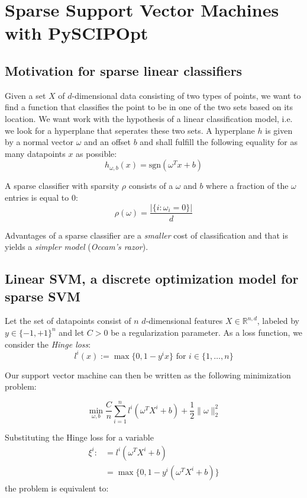 \documentclass[12pt]{article}
\newcommand\abs[1]{\left|#1\right|}
\newcommand{\R}{\mathbb{R}}
\begin{document}
\section*{Sparse Support Vector Machines with PySCIPOpt}

\subsection*{Motivation for sparse linear classifiers}

Given a set $X$ of $d$-dimensional data consisting of two types of points, we want to find a function that classifies the point to be in one of the two sets based on its location.
We want work with the hypothesis of a linear classification model, i.e. we look for a hyperplane that seperates these two sets.
A hyperplane $h$ is given by a normal vector $\omega$ and an offset $b$ and shall fulfill the following equality for as many datapoints $x$ as possible:
$$ h_{\omega, b}(x) = \text{sgn} (\omega^{T}x + b) $$

A sparse classifier with sparsity $\rho$ consists of a $\omega$ and $b$ where a fraction of the $\omega$ entries is equal to 0:
$$ \rho(\omega) = \frac{\abs{\{ i \colon \omega_{i} = 0 \}}}{d} $$

Advantages of a sparse classifier are a \emph{smaller} cost of classification and that is yields a \emph{simpler model} (\emph{Occam's razor}).

\subsection*{Linear SVM, a discrete optimization model for sparse SVM}

Let the set of datapoints consist of $n$ $d$-dimensional features $X \in \R^{n,d}$, labeled by $y \in \{-1,+1\}^{n}$ and let $C > 0$ be a regularization parameter.
As a loss function, we consider the \emph{Hinge loss}:
$$l^{i}(x) :=  \max \{0, 1 - y^{i}x\} \text{ for } i \in \{1,\dots, n\}$$

Our support vector machine can then be written as the following minimization problem:

$$
\min\limits_{\omega, b}
\frac{C}{n} \sum\limits_{i = 1}^{n} l^i(\omega^{T}X^{i} + b)
+\frac{1}{2} \lVert \omega \rVert_{2}^{2}
$$

Substituting the Hinge loss for a variable
\begin{align*}
  \xi^{i} :&= l^i(\omega^{T}X^{i} + b) \\
  &= \max \{0, 1 - y^i (\omega^{T}X^{i} + b) \}
\end{align*}
the problem is equivalent to:
\end{document}
